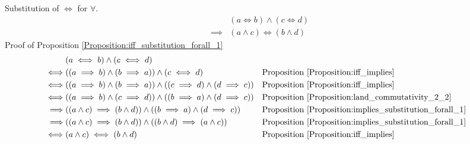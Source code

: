 \begin{prop}
\label{Proposition:iff_substitution_forall_1}
Substitution of $\iff$ for $\forall$.
\begin{align*}
& (a \iff b) \land (c \iff d) \\
\implies & (a \land c) \iff (b \land d)
\end{align*}
Proof of Proposition \ref{Proposition:iff_substitution_forall_1}
\begin{align*}
& (a \iff b) \land (c \iff d) \\
\iff & ((a \implies b) \land (b \implies a)) \land (c \iff d)
& & \text{Proposition \ref{Proposition:iff_implies}} \\
\iff & ((a \implies b) \land (b \implies a)) \land ((c \implies d) \land (d \implies c))
& & \text{Proposition \ref{Proposition:iff_implies}} \\
\iff & ((a \implies b) \land (c \implies d)) \land ((b \implies a) \land (d \implies c))
& & \text{Proposition \ref{Proposition:land_commutativity_2_2}} \\
\implies & ((a \land c) \implies (b \land d)) \land ((b \implies a) \land (d \implies c))
& & \text{Proposition \ref{Proposition:implies_substitution_forall_1}} \\
\implies & ((a \land c) \implies (b \land d)) \land ((b \land d) \implies (a \land c))
& & \text{Proposition \ref{Proposition:implies_substitution_forall_1}} \\
\iff & (a \land c) \iff (b \land d)
& & \text{Proposition \ref{Proposition:iff_implies}} \\
\end{align*}
\end{prop}

